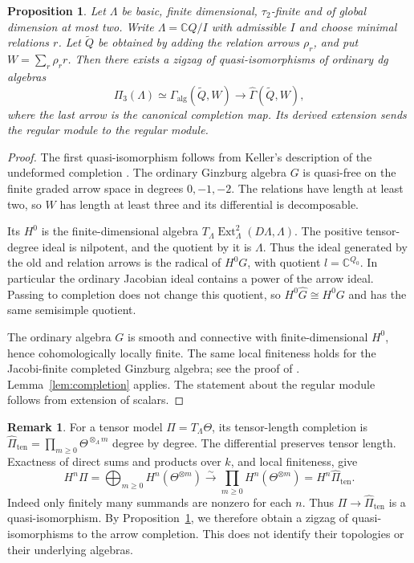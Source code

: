 \documentclass[12pt,a4paper,english,reqno]{amsart}
\theoremstyle{plain}
\newtheorem{prp}[thm]{Proposition}
\theoremstyle{definition}
\newtheorem{rmk}[thm]{Remark}
\numberwithin{equation}{section}
\newcommand{\prpref}[1]{Proposition~\ref{#1}}
\newcommand{\lemref}[1]{Lemma~\ref{#1}}
\def\ro{\rho}
\def\ta{\tau}
\def\Ga{\Gamma}
\def\La{\Lambda}
\def\Th{\Theta}
\def\bbC{{\mathbb C}}
\def\iso{\cong}
\def\ox{\otimes}
\def\Ds{\bigoplus}
\def\ya#1{\xrightarrow{#1}}
\begin{document}
\begin{prp}\label{prop:canonical-completion}
Let $\La$ be basic, finite dimensional, $\ta_2$-finite and of global dimension at most two. Write $\La=\bbC Q/I$ with admissible $I$ and choose minimal relations $r$. Let $\widetilde Q$ be obtained by adding the relation arrows $\ro_r$, and put $W=\sum_r\ro_r r$. Then there exists a zigzag of quasi-isomorphisms of ordinary dg algebras
\[
 \Pi_3(\La)\simeq
 \Ga_{\mathrm{alg}}(\widetilde Q,W)
 \longrightarrow\widehat\Ga(\widetilde Q,W),
\]
where the last arrow is the canonical completion map. Its derived extension sends the regular module to the regular module.
\end{prp}
\begin{proof}
The first quasi-isomorphism follows from Keller's description of the undeformed completion \cite[Theorem 6.10]{Keller}. The ordinary Ginzburg algebra $G$ is quasi-free on the finite graded arrow space in degrees $0,-1,-2$. The relations have length at least two, so $W$ has length at least three and its differential is decomposable.

Its $H^0$ is the finite-dimensional algebra
$T_\La\operatorname{Ext}^2_\La(D\La,\La)$.
The positive tensor-degree ideal is nilpotent, and the quotient by it is $\La$. Thus the ideal generated by the old and relation arrows is the radical of $H^0G$, with quotient $l=\bbC^{Q_0}$. In particular the ordinary Jacobian ideal contains a power of the arrow ideal. Passing to completion does not change this quotient, so $H^0\widehat G\iso H^0G$ and has the same semisimple quotient.

The ordinary algebra $G$ is smooth and connective with finite-dimensional $H^0$, hence cohomologically locally finite. The same local finiteness holds for the Jacobi-finite completed Ginzburg algebra; see the proof of \cite[Theorem 4.17]{HK}. \lemref{lem:completion} applies. The statement about the regular module follows from extension of scalars.
\end{proof}

\begin{rmk}
For a tensor model $\Pi=T_\La\Th$, its tensor-length completion is
$\widehat\Pi_{\mathrm{ten}}=\prod_{m\ge0}\Th^{\ox_\La m}$ degree by degree. The differential preserves tensor length. Exactness of direct sums and products over $k$, and local finiteness, give
\[
 H^n\Pi=\Ds_{m\ge0}H^n(\Th^{\ox m})
 \ya{\sim}\prod_{m\ge0}H^n(\Th^{\ox m})
 =H^n\widehat\Pi_{\mathrm{ten}}.
\]
Indeed only finitely many summands are nonzero for each $n$. Thus $\Pi\to\widehat\Pi_{\mathrm{ten}}$ is a quasi-isomorphism. By \prpref{prop:canonical-completion}, we therefore obtain a zigzag of quasi-isomorphisms to the arrow completion. This does not identify their topologies or their underlying algebras.
\end{rmk}
\end{document}
